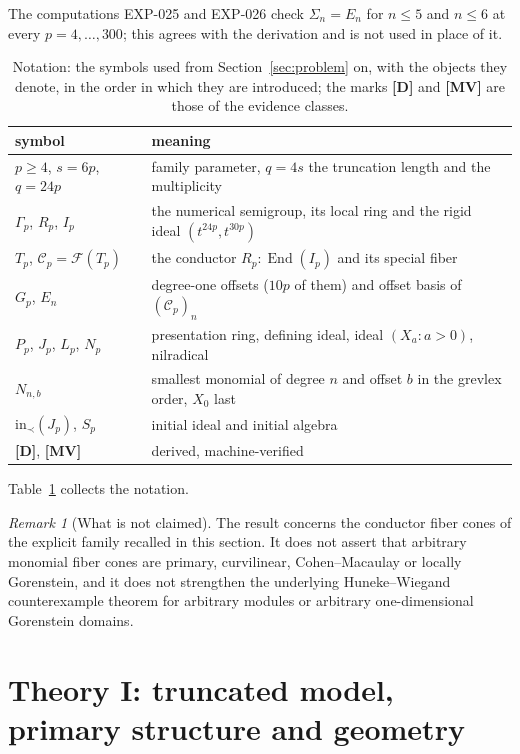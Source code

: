\documentclass[11pt]{article}
\theoremstyle{definition}
\theoremstyle{remark}
\newtheorem{remark}[theorem]{Remark}
\newcommand{\Cfiber}{\mathcal{C}}
\newcommand{\Fcone}{\mathcal{F}}
\newcommand{\mD}{\textbf{[D]}}
\newcommand{\mMV}{\textbf{[MV]}}
\begin{document}
The computations EXP-025 and EXP-026 check $\Sigma_n=E_n$ for $n\leq5$ and $n\leq6$ at every
$p=4,\ldots,300$; this agrees with the derivation and is not used in place of it.

\begin{table}[ht]
\centering
\small
\begin{tabular}{@{}ll@{}}
\toprule
symbol & meaning\\
\midrule
$p\geq4$, $s=6p$, $q=24p$ & family parameter, $q=4s$ the truncation length and the multiplicity\\
$\Gamma_p$, $R_p$, $I_p$ & the numerical semigroup, its local ring and the rigid ideal $(t^{24p},t^{30p})$\\
$T_p$, $\Cfiber_p=\Fcone(T_p)$ & the conductor $R_p:\operatorname{End}(I_p)$ and its special fiber\\
$G_p$, $E_n$ & degree-one offsets ($10p$ of them) and offset basis of $(\Cfiber_p)_n$\\
$P_p$, $J_p$, $L_p$, $N_p$ & presentation ring, defining ideal, ideal $(X_a:a>0)$, nilradical\\
$N_{n,b}$ & smallest monomial of degree $n$ and offset $b$ in the grevlex order, $X_0$ last\\
$\mathrm{in}_\prec(J_p)$, $S_p$ & initial ideal and initial algebra\\
\mD{}, \mMV{} & derived, machine-verified\\
\bottomrule
\end{tabular}
\caption{Notation: the symbols used from Section~\ref{sec:problem} on, with the objects they denote, in the
order in which they are introduced; the marks \mD{} and \mMV{} are those of the evidence classes.}
\label{tab:notation}
\end{table}

Table~\ref{tab:notation} collects the notation.

\begin{remark}[What is not claimed]
The result concerns the conductor fiber cones of the explicit family recalled in this section.
It does not assert that arbitrary monomial fiber cones are primary, curvilinear,
Cohen--Macaulay or locally Gorenstein, and it does not strengthen the underlying
Huneke--Wiegand counterexample theorem for arbitrary modules or arbitrary one-dimensional
Gorenstein domains.
\end{remark}

\section{Theory I: truncated model, primary structure and geometry}\label{sec:theory-a}
\end{document}
